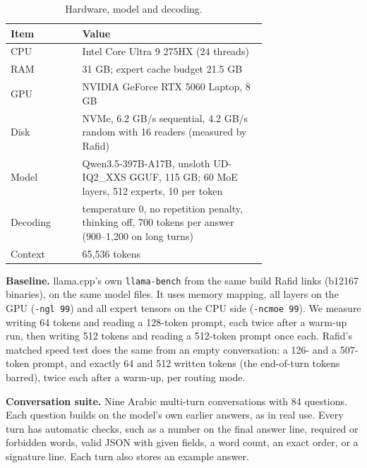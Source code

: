 \begin{table}[t]
\centering\small
\caption{Hardware, model and decoding.}\label{tab:setup}
\begin{tabular}{lp{0.72\linewidth}}
\toprule
Item & Value \\
\midrule
CPU & Intel Core Ultra 9 275HX (24 threads) \\
RAM & 31 GB; expert cache budget 21.5 GB \\
GPU & NVIDIA GeForce RTX 5060 Laptop, 8 GB \\
Disk & NVMe, 6.2 GB/s sequential, 4.2 GB/s random with 16 readers (measured by Rafid) \\
Model & Qwen3.5-397B-A17B, unsloth UD-IQ2\_XXS GGUF, 115 GB; 60 MoE layers, 512 experts, 10 per token \\
Decoding & temperature 0, no repetition penalty, thinking off, 700 tokens per answer (900--1,200 on long turns) \\
Context & 65,536 tokens \\
\bottomrule
\end{tabular}
\end{table}

\textbf{Baseline.} llama.cpp's own \texttt{llama-bench} from the same build Rafid links (b12167 binaries), on the same model files. It uses memory mapping, all layers on the GPU (\texttt{-ngl 99}) and all expert tensors on the CPU side (\texttt{-ncmoe 99}). We measure writing 64 tokens and reading a 128-token prompt, each twice after a warm-up run, then writing 512 tokens and reading a 512-token prompt once each. Rafid's matched speed test does the same from an empty conversation: a 126- and a 507-token prompt, and exactly 64 and 512 written tokens (the end-of-turn tokens barred), twice each after a warm-up, per routing mode.

\textbf{Conversation suite.} Nine Arabic multi-turn conversations with 84 questions. Each question builds on the model's own earlier answers, as in real use. Every turn has automatic checks, such as a number on the final answer line, required or forbidden words, valid JSON with given fields, a word count, an exact order, or a signature line. Each turn also stores an example answer.


